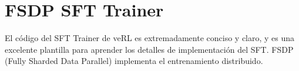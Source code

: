 \section{FSDP SFT Trainer}
El código del SFT Trainer de veRL es extremadamente conciso y claro, y es una excelente plantilla para aprender los detalles de implementación del SFT. FSDP (Fully Sharded Data Parallel) implementa el entrenamiento distribuido.

